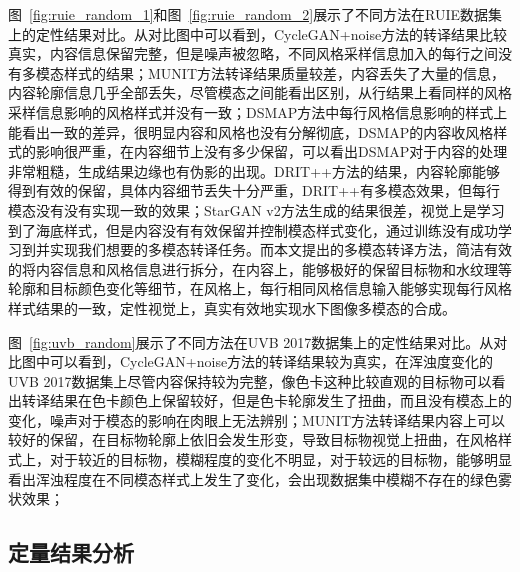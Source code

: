图~\ref{fig:ruie_random_1}和图~\ref{fig:ruie_random_2}展示了不同方法在RUIE数据集上的定性结果对比。从对比图中可以看到，CycleGAN+noise方法的转译结果比较真实，内容信息保留完整，但是噪声被忽略，不同风格采样信息加入的每行之间没有多模态样式的结果；MUNIT方法转译结果质量较差，内容丢失了大量的信息，内容轮廓信息几乎全部丢失，尽管模态之间能看出区别，从行结果上看同样的风格采样信息影响的风格样式并没有一致；DSMAP方法中每行风格信息影响的样式上能看出一致的差异，很明显内容和风格也没有分解彻底，DSMAP的内容收风格样式的影响很严重，在内容细节上没有多少保留，可以看出DSMAP对于内容的处理非常粗糙，生成结果边缘也有伪影的出现。DRIT++方法的结果，内容轮廓能够得到有效的保留，具体内容细节丢失十分严重，DRIT++有多模态效果，但每行模态没有没有实现一致的效果；StarGAN v2方法生成的结果很差，视觉上是学习到了海底样式，但是内容没有有效保留并控制模态样式变化，通过训练没有成功学习到并实现我们想要的多模态转译任务。而本文提出的多模态转译方法，简洁有效的将内容信息和风格信息进行拆分，在内容上，能够极好的保留目标物和水纹理等轮廓和目标颜色变化等细节，在风格上，每行相同风格信息输入能够实现每行风格样式结果的一致，定性视觉上，真实有效地实现水下图像多模态的合成。

图~\ref{fig:uvb_random}展示了不同方法在UVB 2017数据集上的定性结果对比。从对比图中可以看到，CycleGAN+noise方法的转译结果较为真实，在浑浊度变化的UVB 2017数据集上尽管内容保持较为完整，像色卡这种比较直观的目标物可以看出转译结果在色卡颜色上保留较好，但是色卡轮廓发生了扭曲，而且没有模态上的变化，噪声对于模态的影响在肉眼上无法辨别；MUNIT方法转译结果内容上可以较好的保留，在目标物轮廓上依旧会发生形变，导致目标物视觉上扭曲，在风格样式上，对于较近的目标物，模糊程度的变化不明显，对于较远的目标物，能够明显看出浑浊程度在不同模态样式上发生了变化，会出现数据集中模糊不存在的绿色雾状效果；

\subsection{定量结果分析}

